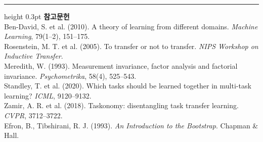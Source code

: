 \documentclass[10pt]{article}
\begin{document}
\vspace{0.6em}
\hrule height 0.3pt
\vspace{0.5em}
{\footnotesize
\textbf{참고문헌}\\[0.3em]
Ben-David, S. et al. (2010). A theory of learning from different domains.
\emph{Machine Learning}, 79(1--2), 151--175.\\[0.15em]
Rosenstein, M. T. et al. (2005). To transfer or not to transfer.
\emph{NIPS Workshop on Inductive Transfer}.\\[0.15em]
Meredith, W. (1993). Measurement invariance, factor analysis and factorial
invariance. \emph{Psychometrika}, 58(4), 525--543.\\[0.15em]
Standley, T. et al. (2020). Which tasks should be learned together in multi-task
learning? \emph{ICML}, 9120--9132.\\[0.15em]
Zamir, A. R. et al. (2018). Taskonomy: disentangling task transfer learning.
\emph{CVPR}, 3712--3722.\\[0.15em]
Efron, B., Tibshirani, R. J. (1993). \emph{An Introduction to the Bootstrap}.
Chapman \& Hall.
}
\end{document}
